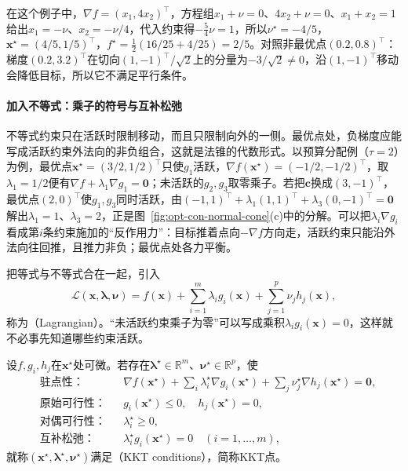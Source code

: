 在这个例子中，$\nabla f=(x_1,4x_2)^\top$，方程组$x_1+\nu=0$、$4x_2+\nu=0$、$x_1+x_2=1$给出$x_1=-\nu$、$x_2=-\nu/4$，代入约束得$-\frac54\nu=1$，所以$\nu^\star=-4/5$，$\bm x^\star=(4/5,1/5)^\top$，$f^\star=\frac12(16/25+4/25)=2/5$。对照非最优点$(0.2,0.8)^\top$：梯度$(0.2,3.2)^\top$在切向$(1,-1)^\top/\sqrt2$上的分量为$-3/\sqrt2\neq0$，沿$(1,-1)^\top$移动会降低目标，所以它不满足平行条件。

\paragraph{加入不等式：乘子的符号与互补松弛}
不等式约束只在活跃时限制移动，而且只限制向外的一侧。最优点处，负梯度应能写成活跃约束外法向的非负组合，这就是法锥的代数形式。以预算分配例（$\tau=2$）为例，最优点$\bm x^\star=(3/2,1/2)^\top$只使$g_1$活跃，$\nabla f(\bm x^\star)=(-1/2,-1/2)^\top$，取$\lambda_1=1/2$便有$\nabla f+\lambda_1\nabla g_1=\bm0$；未活跃的$g_2,g_3$取零乘子。若把$\bm c$换成$(3,-1)^\top$，最优点$(2,0)^\top$使$g_1,g_3$同时活跃，由$(-1,1)^\top+\lambda_1(1,1)^\top+\lambda_3(0,-1)^\top=\bm0$解出$\lambda_1=1$、$\lambda_3=2$，正是图~\ref{fig:opt-con-normal-cone}(c)中的分解。可以把$\lambda_i\nabla g_i$看成第$i$条约束施加的“反作用力”：目标推着点向$-\nabla f$方向走，活跃约束只能沿外法向往回推，且推力非负；最优点处各力平衡。

把等式与不等式合在一起，引入
\begin{equation}
\label{eq:opt-con-lagrangian}
  \mathcal L(\bm x,\bm\lambda,\bm\nu)=f(\bm x)+\sum_{i=1}^m\lambda_ig_i(\bm x)+\sum_{j=1}^p\nu_jh_j(\bm x),
\end{equation}
称为（Lagrangian）。“未活跃约束乘子为零”可以写成乘积$\lambda_ig_i(\bm x)=0$，这样就不必事先知道哪些约束活跃。

\begin{definition}[KKT条件]
\label{def:opt-con-kkt}
设$f,g_i,h_j$在$\bm x^\star$处可微。若存在$\bm\lambda^\star\in\mathbb R^m$、$\bm\nu^\star\in\mathbb R^p$，使
\begin{align*}
  &\text{驻点性：}&&\nabla f(\bm x^\star)+\textstyle\sum_i\lambda_i^\star\nabla g_i(\bm x^\star)+\sum_j\nu_j^\star\nabla h_j(\bm x^\star)=\bm0,\\
  &\text{原始可行性：}&&g_i(\bm x^\star)\leq0,\quad h_j(\bm x^\star)=0,\\
  &\text{对偶可行性：}&&\lambda_i^\star\geq0,\\
  &\text{互补松弛：}&&\lambda_i^\star g_i(\bm x^\star)=0\quad(i=1,\dots,m),
\end{align*}
就称$(\bm x^\star,\bm\lambda^\star,\bm\nu^\star)$满足（KKT conditions），简称KKT点。
\end{definition}

